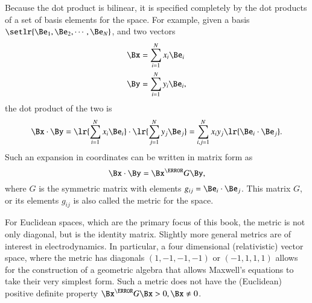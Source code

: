 %
%

Because the dot product is bilinear, it is
specified completely by the dot products of a set of basis elements for the space.
For example,
given a basis \( \setlr{ \Be_1, \Be_2, \cdots, \Be_N} \), and two vectors
\begin{dmath}\label{eqn:prereq_standardbasis:240}
\begin{aligned}
   \Bx &= \sum_{i = 1}^N x_i \Be_i \\
   \By &= \sum_{i = 1}^N y_i \Be_i,
\end{aligned}
\end{dmath}
the dot product of the two is
\begin{dmath}\label{eqn:prereq_standardbasis:260}
\Bx \cdot \By
=
   \lr{ \sum_{i = 1}^N x_i \Be_i } \cdot
   \lr{ \sum_{j = 1}^N y_j \Be_j }
=
   \sum_{i,j = 1}^N x_i y_j \lr{ \Be_i \cdot \Be_j }.
\end{dmath}
Such an expansion in coordinates can be written in matrix form as
\begin{dmath}\label{eqn:prereq_standardbasis:280}
\Bx \cdot \By
=
\Bx^\T G \By,
\end{dmath}
where \( G \) is the symmetric matrix with elements \( g_{ij} = \Be_i \cdot \Be_j \).
This matrix \( G \), or its elements \( g_{ij} \) is also called the metric for the space.

For Euclidean spaces, which are the primary focus of this book, the metric is not only diagonal, but is the identity matrix.
Slightly more general metrics are of interest in electrodynamics.  In particular, a four dimensional (relativistic) vector space, where the metric has diagonals \( (1,-1,-1,-1) \) or \( (-1, 1,1,1) \) allows for the construction of a geometric algebra that allows Maxwell's equations to take their very simplest form.  Such a metric does not have the (Euclidean) positive definite property \( \Bx^\T G \Bx > 0, \Bx \ne 0 \).

